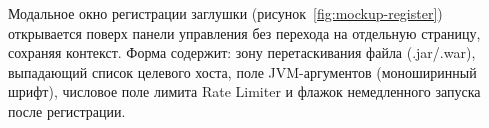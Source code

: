 

Модальное окно регистрации заглушки (рисунок~\ref{fig:mockup-register}) открывается поверх панели управления без перехода на отдельную страницу, сохраняя контекст. Форма содержит: зону перетаскивания файла (.jar/.war), выпадающий список целевого хоста, поле JVM-аргументов (моноширинный шрифт), числовое поле лимита Rate Limiter и флажок немедленного запуска после регистрации.







